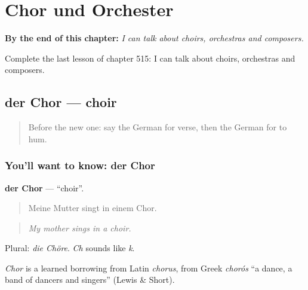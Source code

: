 
\chapter{Chor und Orchester}
\label{ch:ge-chor-und-orchester}

\begin{chapteropening}
\textbf{By the end of this chapter:} \emph{I can talk about choirs, orchestras and composers.}

Complete the last lesson of chapter 515: I can talk about choirs, orchestras and composers.
\end{chapteropening}

\section[der Chor]{der Chor — choir}

\label{lesson:GE-C515-chor}



\begin{quote}
Before the new one: say the German for verse, then the German for to hum.
\end{quote}

\subsection*{You'll want to know: der Chor}
\textbf{der Chor} — \textquotedblleft{}choir\textquotedblright{}.

\begin{quote}
Meine Mutter singt in einem Chor.
\end{quote}

\begin{quote}
\emph{My mother sings in a choir.}
\end{quote}

Plural: \emph{die Chöre}. \emph{Ch} sounds like \emph{k}.

\begin{cousinweb}
\emph{Chor} is a learned borrowing from Latin \emph{chorus}, from Greek \emph{chorós} \textquotedblleft{}a dance, a band of dancers and singers\textquotedblright{} (Lewis \& Short).
\end{cousinweb}

